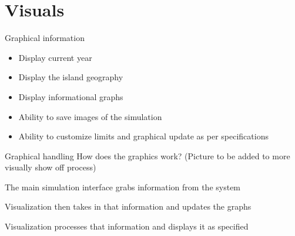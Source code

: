 \section{Visuals}


\begin{frame}{Graphical information}
    \begin{figure}
    \end{figure}
    \begin{itemize}[<+->]
        \item Display current year
        \item Display the island geography
        \item Display informational graphs
        \item Ability to save images of the simulation
        \item Ability to customize limits
        and graphical update as per specifications
    \end{itemize}
\end{frame}

\begin{frame}{Graphical handling}
    How does the graphics work?         (Picture to be added to more visually show off process)

    \pause The main simulation interface grabs information from the system

    \pause Visualization then takes in that information and updates the graphs

    \pause Visualization processes that information and displays it as specified

\end{frame}
